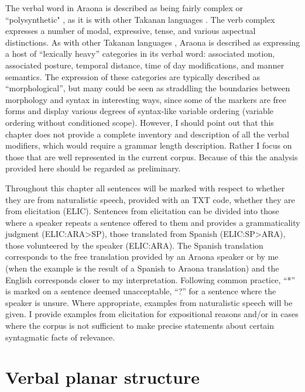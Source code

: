 \documentclass[output=paper,hidelinks]{langscibook}
\begin{document}
The verbal word in Araona is described as being fairly complex \citep{pitman:1980:araonasketch} or ``polysynthetic" \citep{emkow:2019:araonarepublish}, as it is with other Takanan languages \citep{guillaume:forthcoming}. The verb complex expresses a number of modal, expressive, tense, and various aspectual distinctions. As with other Takanan languages \citep{guillaume:forthcoming}, Araona is described as expressing a host of ``lexically heavy'' categories in its verbal word: associated motion, associated posture, temporal distance, time of day modifications, and manner semantics. The expression of these categories are typically described as ``morphological'', but many could be seen as straddling the boundaries between morphology and syntax in interesting ways, since some of the markers are free forms and display various degrees of syntax-like variable ordering (variable ordering without conditioned scope). However, I should point out that this chapter does not provide a complete inventory and description of all the verbal modifiers, which would require a grammar length description. Rather I focus on those that are well represented in the current corpus. Because of this the analysis provided here should be regarded as preliminary.

Throughout this chapter all sentences will be marked with respect to whether they are from naturalistic speech, provided with an TXT code, whether they are from elicitation (ELIC). Sentences from elicitation can be divided into those where a speaker repeats a sentence offered to them and provides a grammaticality judgment (ELIC:ARA\textgreater{}SP), those translated from Spanish (ELIC:SP\textgreater{}ARA), those volunteered by the speaker (ELIC:ARA). The Spanish translation corresponds to the free translation provided by an Araona speaker or by me (when the example is the result of a Spanish to Araona translation) and the English corresponds closer to my interpretation. Following common practice, ``*'' is marked on a sentence deemed unacceptable, ``?'' for a sentence where the speaker is unsure. Where appropriate, examples from naturalistic speech will be given. I provide examples from elicitation for expositional reasons and/or in cases where the corpus is not sufficient to make precise statements about certain syntagmatic facts of relevance.


\section{Verbal planar structure} %
\label{araona:sec:planarstructures}
\end{document}
